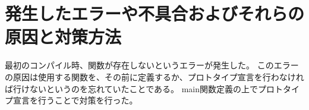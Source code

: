 

\section{発生したエラーや不具合およびそれらの原因と対策方法}
最初のコンパイル時、関数が存在しないというエラーが発生した。
このエラーの原因は使用する関数を、その前に定義するか、プロトタイプ宣言を行わなければ行けないというのを忘れていたことである。
main関数定義の上でプロトタイプ宣言を行うことで対策を行った。




